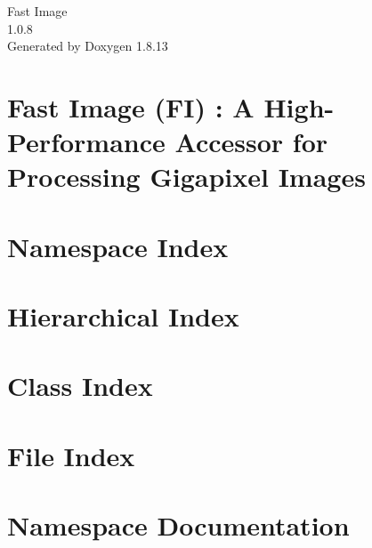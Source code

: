 \documentclass[twoside]{book}
\newcommand{\+}{\discretionary{\mbox{\scriptsize$\hookleftarrow$}}{}{}}
\newcommand{\clearemptydoublepage}{%
  \newpage{\pagestyle{empty}\cleardoublepage}%
}
\begin{document}
\hypersetup{pageanchor=false,
             bookmarksnumbered=true,
             pdfencoding=unicode
            }
\begin{titlepage}
\vspace*{7cm}
\begin{center}%
{\Large Fast Image \\[1ex]\large 1.\+0.\+8 }\\
\vspace*{1cm}
{\large Generated by Doxygen 1.8.13}\\
\end{center}
\end{titlepage}
\clearemptydoublepage
{}
\tableofcontents
\clearemptydoublepage
{}
\hypersetup{pageanchor=true}

\chapter{Fast Image (FI) \+: A High-\/\+Performance Accessor for Processing Gigapixel Images}
\label{index}\hypertarget{index}{}
\chapter{Namespace Index}

\chapter{Hierarchical Index}

\chapter{Class Index}

\chapter{File Index}

\chapter{Namespace Documentation}


\end{document}
